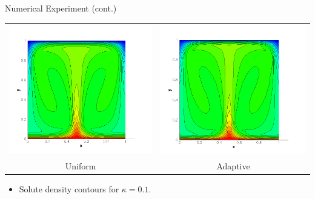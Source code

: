 \documentclass[compress,12pt]{beamer}
\begin{document}
\begin{frame}{Numerical Experiment (cont.)}
    {
      \begin{center}\begin{tabular}{cc} \\
	\includegraphics[width=.5\textwidth]{figures/s_80x80_kappa_0_10}&
	\includegraphics[width=.5\textwidth]{figures/s_adapt_kappa_0_10}\\
	Uniform &
	Adaptive
      \end{tabular}\end{center}
      \begin{itemize}
      \item Solute density contours for $\kappa=0.1$.
      \end{itemize}
    }


\end{frame}
\end{document}
